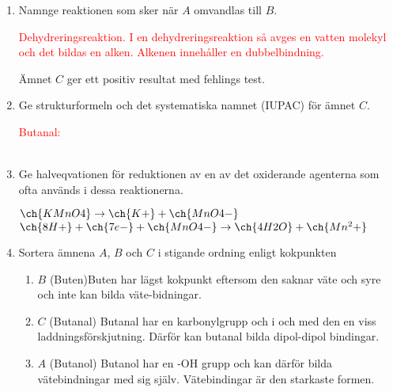 \documentclass[12pt, letterpaper, twoside]{article}
\begin{document}
\begin{flushleft}
\begin{enumerate}[label=\textbf{\alph*)}]
\begin{enumerate}[label=\textbf{\roman*. }]
        \hfill

        \item %
        Namnge reaktionen som sker när $ A $ omvandlas till $ B $.

        \textcolor{red}{
            Dehydreringsreaktion. I en dehydreringsreaktion så avges en vatten molekyl och det bildas en alken. Alkenen innehåller en dubbelbindning.
        }

        \pagebreak

        \noindent Ämnet $ C $ ger ett positiv resultat med fehlings test.

        \hfill

        \item %
        Ge strukturformeln och det systematiska namnet (IUPAC) för ämnet $ C $.

        \hfill

        \textcolor{red}{
            Butanal: \\
            \hfill \\
        }



        \hfill

        \item %
        Ge halveqvationen för reduktionen av en av det oxiderande agenterna som
        ofta används i dessa reaktionerna.


        \textcolor{red}{
            \textit{$ \ch{KMnO4} \rightarrow \ch{K+} + \ch{MnO4-} $}\\
            \textit{$ \ch{8 H+} + \ch{7 e-} + \ch{MnO4-} \rightarrow \ch{4 H2O} + \ch{Mn^2+} $}
        }

        \item %
        Sortera ämnena $ A $, $ B $ och $ C $ i stigande ordning enligt kokpunkten

        \begin{enumerate}[label=\textbf{\arabic*. }]
        \color{red}
                \item
                $ B $ (Buten)Buten har lägst kokpunkt eftersom den saknar väte och syre och inte kan bilda väte-bidningar.
                \item
                $ C $ (Butanal) Butanal har en karbonylgrupp och i och med den en viss laddningsförskjutning. Därför kan butanal bilda dipol-dipol bindingar.
                \item
                $ A $ (Butanol)
                Butanol har en -OH grupp och kan därför bilda vätebindningar med sig själv. Vätebindingar är den starkaste formen.


\end{enumerate}
\end{enumerate}
\end{enumerate}
\end{flushleft}
\end{document}
